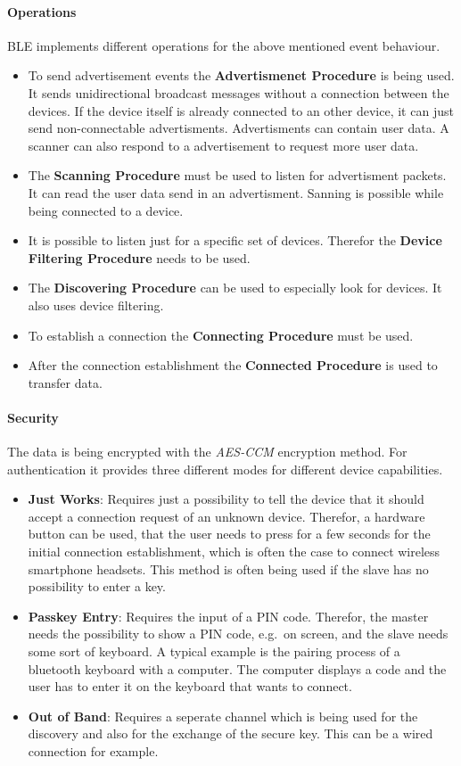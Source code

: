 \paragraph{Operations}
\acs{BLE} implements different operations for the above mentioned event behaviour\cite{bluetooth:spec}.
\begin{itemize}
  \item To send advertisement events the \textbf{Advertismenet Procedure} is being used.
    It sends unidirectional broadcast messages without a connection between the devices.
    If the device itself is already connected to an other device, it can just send non-connectable advertisments.
    Advertisments can contain user data.
    A scanner can also respond to a advertisement to request more user data.
  \item The \textbf{Scanning Procedure} must be used to listen for advertisment packets.
    It can read the user data send in an advertisment.
    Sanning is possible while being connected to a device.
  \item It is possible to listen just for a specific set of devices.
    Therefor the \textbf{Device Filtering Procedure} needs to be used.
  \item The \textbf{Discovering Procedure} can be used to especially look for devices.
    It also uses device filtering.
  \item To establish a connection the \textbf{Connecting Procedure} must be used.
  \item After the connection establishment the \textbf{Connected Procedure} is used to transfer data.
\end{itemize}

\paragraph{Security}
The data is being encrypted with the \emph{AES-CCM} encryption method.
For authentication it provides three different modes for different device capabilities\cite{bluetooth:spec}.
\begin{itemize}
  \item \textbf{Just Works}: Requires just a possibility to tell the device that it should accept a connection request of an unknown device.
    Therefor, a hardware button can be used, that the user needs to press for a few seconds for the initial connection establishment, which is often the case to connect wireless smartphone headsets. This method is often being used if the slave has no possibility to enter a key.
  \item \textbf{Passkey Entry}: Requires the input of a PIN code.
    Therefor, the master needs the possibility to show a PIN code, e.g.\ on screen, and the slave needs some sort of keyboard.
    A typical example is the pairing process of a bluetooth keyboard with a computer.
    The computer displays a code and the user has to enter it on the keyboard that wants to connect.
  \item \textbf{Out of Band}: Requires a seperate channel which is being used for the discovery and also for the exchange of the secure key.
    This can be a wired connection for example.
\end{itemize}

